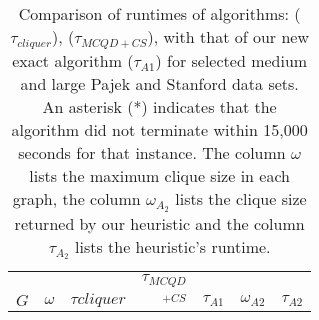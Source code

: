 \begin{table}[!hbt]
\centering
\caption{Comparison of runtimes of algorithms: \cite{ostergard} ({\it $\tau_{cliquer}$}), \cite{konc2007improved} ({\it $\tau_{MCQD+CS}$}), 
with that of our new exact algorithm ($\tau_{A1}$) for selected medium and large Pajek and Stanford data sets. 
An asterisk (*) indicates that the algorithm did not terminate within 
15,000 seconds for that instance. The column $\omega$ lists the maximum clique size in each graph, 
the column $\omega_{A_2}$ lists the clique size returned by our heuristic and the column
$\tau_{A_2}$ lists the heuristic's runtime.}
\label{tab:pajek_stanford}
\begin{tabular}{lr|rrr|rr}
\toprule\toprule
	&		&			&	$\tau_{MCQD}$	&		&		&		\\
$G$	&	$\omega$	&	$\tau{cliquer}$	&	$_{+CS}$	&	$\tau_{A1}$	&	$\omega_{A2}$	&	$\tau_{A2}$	\\ \hline \hline

\end{tabular}
\end{table}
